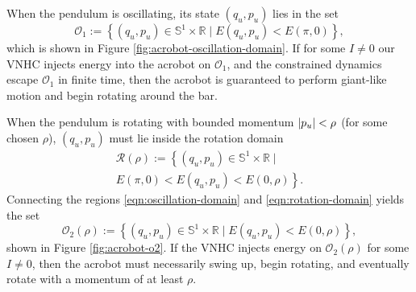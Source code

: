 \documentclass[journal,twoside,web, twocolumn,draftcls]{ieeecolor}
\DeclarePairedDelimiter{\abs}{\lvert}{\rvert}
\newcommand*{\R}{\mathbb{R}}
\newcommand*{\Sone}{\mathbb{S}^1}
\newcommand*{\SxR}{\Sone \times \R}
\begin{document}
When the pendulum is oscillating, its state \((q_u,p_u)\) lies in the set
\begin{equation}\label{eqn:oscillation-domain}
    \mathcal{O}_1 := \left\{(q_u,p_u) \in \SxR 
    \mid E(q_u,p_u) < E(\pi,0) \right\}
    ,
\end{equation}
which is shown in Figure \ref{fig:acrobot-oscillation-domain}.
If for some \(I \neq 0\) our VNHC injects energy into the acrobot on 
\(\mathcal{O}_1\), and the constrained dynamics escape
\(\mathcal{O}_1\) in finite time, then the acrobot is guaranteed to perform
giant-like motion and begin rotating around the bar.

When the pendulum is rotating with bounded momentum
\(\abs{p_u} < \rho\) (for some chosen \(\rho\)),
\((q_u,p_u)\) must lie inside the rotation domain
\begin{multline}\label{eqn:rotation-domain}
    \mathcal{R}(\rho) := \left\{
        (q_u,p_u) \in \SxR \mid\right.
        \\
        \left.E(\pi,0) < E(q_u,p_u) < E(0,\rho)
    \right\}
    .
\end{multline}
Connecting the regions \eqref{eqn:oscillation-domain} and
\eqref{eqn:rotation-domain} yields the set
\begin{equation}\label{eqn:o-rhobar}
    \mathcal{O}_2(\rho) := \left\{(q_u,p_u) \in \SxR
        \mid E(q_u,p_u) < E(0,\rho) \right\}
    ,
\end{equation}
shown in Figure \ref{fig:acrobot-o2}.
If the VNHC injects energy on \(\mathcal{O}_2(\rho)\) for some 
\(I \neq 0\), then the acrobot must necessarily swing up, begin rotating, 
and eventually rotate with a momentum of at least \(\rho\).
\end{document}
